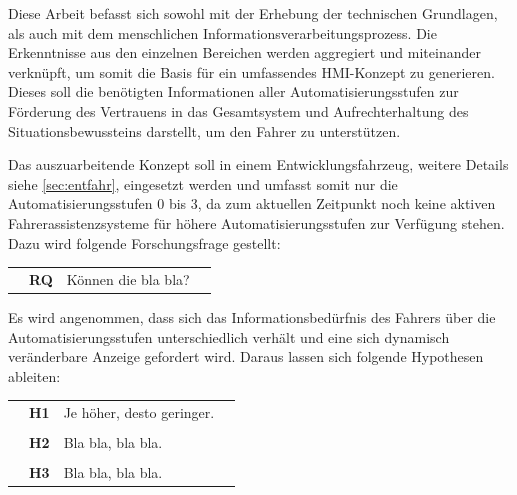 Diese Arbeit befasst sich sowohl mit der Erhebung der technischen Grundlagen, als auch mit dem menschlichen Informationsverarbeitungsprozess. Die Erkenntnisse aus den einzelnen Bereichen werden aggregiert und miteinander verknüpft, um somit die Basis für ein umfassendes HMI-Konzept zu generieren. Dieses soll die benötigten Informationen aller Automatisierungsstufen zur Förderung des Vertrauens in das Gesamtsystem und Aufrechterhaltung des Situationsbewussteins darstellt, um den Fahrer zu unterstützen. 

Das auszuarbeitende Konzept soll in einem Entwicklungsfahrzeug, weitere Details siehe \autoref{sec:entfahr}, eingesetzt werden und umfasst somit nur die Automatisierungsstufen 0 bis 3, da zum aktuellen Zeitpunkt noch keine aktiven Fahrerassistenzsysteme für höhere Automatisierungsstufen zur Verfügung stehen. Dazu wird folgende Forschungsfrage gestellt: \\

\begin{tabular}{p{0.3cm} p{0.5cm} p{13cm} p{0.5cm}}
	& \textbf{RQ}	& Können die bla bla? & \\
\end{tabular}
\vspace{1em} 

Es wird angenommen, dass sich das Informationsbedürfnis des Fahrers über die Automatisierungsstufen unterschiedlich verhält und eine sich dynamisch veränderbare Anzeige gefordert wird. Daraus lassen sich folgende Hypothesen ableiten: \\

\begin{longtable}{p{0.3cm} p{0.5cm} p{13cm} p{0.5cm}}
	& \textbf{H1}	& Je höher, desto geringer. & \\
	& & & \\
	& \textbf{H2}	& Bla bla, bla bla. & \\
	& & & \\
	& \textbf{H3}	& Bla bla, bla bla. & \\
\end{longtable}
